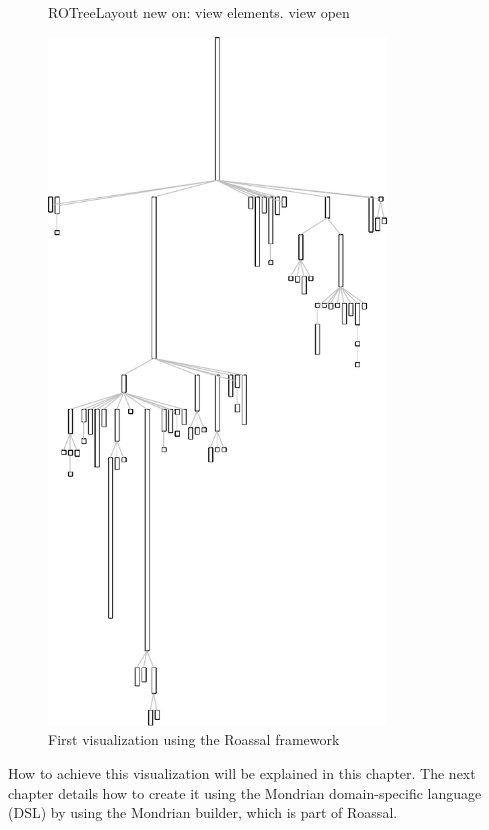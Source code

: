 \documentclass[a4paper,10pt,twoside]{book}
\begin{document}
\begin{figure}[H]
\begin{minipage}[t]{0.55\textwidth}
\begin{code}{}
ROTreeLayout new on: view elements.
view open
\end{code}
\end{minipage}
\hfill
\begin{minipage}[t]{0.48\textwidth}
\vspace{0pt} \raggedright
\centering
\includegraphics[width=0.8\textwidth]{collectionHierarchy}
\end{minipage}
\label{fig:firstVisualization}
\caption{First visualization using the Roassal framework}
\end{figure}

How to achieve this visualization will be explained in this chapter. 
The next chapter details how to create it using the Mondrian domain-specific language (DSL) by using the Mondrian builder, which is part of Roassal.
\end{document}
